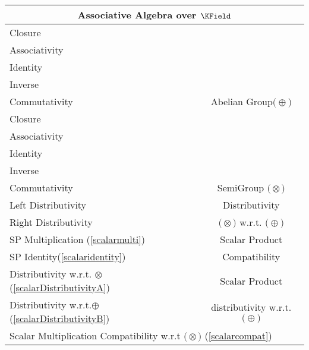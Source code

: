 \documentclass[a4paper,12pt]{scrartcl}
\newcommand{\OpA}{\otimes}
\newcommand{\OpB}{\oplus}
\begin{document}
\begin{minipage}[c]{0,5\textwidth}
\vspace{0.6cm}
\begin{tabular}{|l|c|} %
  \hline
  \multicolumn{2}{c}{\cellcolor{green!25}Associative Algebra over $\KField$} \\
  \hline
    \cellcolor{blue!25} \footnotesize Closure& \cellcolor{yellow!25}  \\
    \cellcolor{blue!25} \footnotesize Associativity& \cellcolor{yellow!25}  \\
    \cellcolor{blue!25} \footnotesize Identity& \cellcolor{yellow!25} \\
    \cellcolor{blue!25} \footnotesize Inverse& \cellcolor{yellow!25} \\
    \cellcolor{blue!25} \footnotesize Commutativity& \multirow{-5}{*}{\tiny\cellcolor{yellow!25}Abelian Group$\big(\OpB\big)$} \\
   \hline
    \cellcolor{blue!25} \footnotesize Closure& \cellcolor{yellow!25}  \\
    \cellcolor{blue!25} \footnotesize Associativity& \cellcolor{yellow!25}  \\
    \cellcolor{red!25} \footnotesize Identity& \cellcolor{yellow!25} \\
    \cellcolor{red!25} \footnotesize Inverse& \cellcolor{yellow!25} \\
    \cellcolor{red!25} \footnotesize Commutativity& \multirow{-5}{*}{\tiny\cellcolor{yellow!25} SemiGroup $\big(\OpA\big)$} \\
  \hline
  	\cellcolor{blue!25} \footnotesize Left Distributivity&  \tiny\cellcolor{yellow!25}Distributivity\\
    \cellcolor{blue!25} \footnotesize Right Distributivity & \tiny\cellcolor{yellow!25} $\big(\OpA\big)$ w.r.t. $\big(\OpB\big)$  \\
   \hline
  \hline
     \cellcolor{blue!25} \footnotesize SP Multiplication (\ref{scalarmulti})&  \tiny\cellcolor{yellow!25}Scalar Product\\
    \cellcolor{blue!25} \footnotesize SP Identity(\ref{scalaridentity}) & \tiny\cellcolor{yellow!25} Compatibility  \\
   \hline 
    \cellcolor{blue!25} \footnotesize Distributivity w.r.t. $\OpA$ (\ref{scalarDistributivityA})&  \tiny\cellcolor{yellow!25}Scalar Product\\
    \cellcolor{blue!25} \footnotesize Distributivity w.r.t.$\OpB$ (\ref{scalarDistributivityB}) & \tiny\cellcolor{yellow!25} distributivity w.r.t. $\big(\OpB\big)$  \\
   \hline
    \multicolumn{2}{l}{\footnotesize \cellcolor{blue!25} Scalar Multiplication Compatibility w.r.t  $\big(\OpA\big)$ (\ref{scalarcompat})}\\
   \hline
\end{tabular}

\end{minipage}
\end{document}
